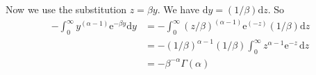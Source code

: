 \documentclass[12pt]{article}
\begin{document}
\begin{enumerate}
                                Now we use the substitution $z = \beta y$. We have  $\mathrm{d}y = (1/\beta) \mathrm{d}z$. So
                                \begin{align*}     
                                    -\int_0^\infty y^{(\alpha - 1)} \mathrm{e}^{-\beta y} \mathrm{d}y &=  -\int_0^\infty (z/\beta)^{(\alpha - 1)}  \mathrm{e}^{(-z)} (1/\beta)  \mathrm{d}z    \\
                                  &= -(1/\beta)^{\alpha - 1} (1/\beta) \int_0^\infty   z^{\alpha - 1}\mathrm{e}^{-z}\,\mathrm{d}z \\
                                  &= -\beta^{-\alpha} \Gamma(\alpha)     
                                \end{align*}

         
\end{enumerate}
\end{document}
